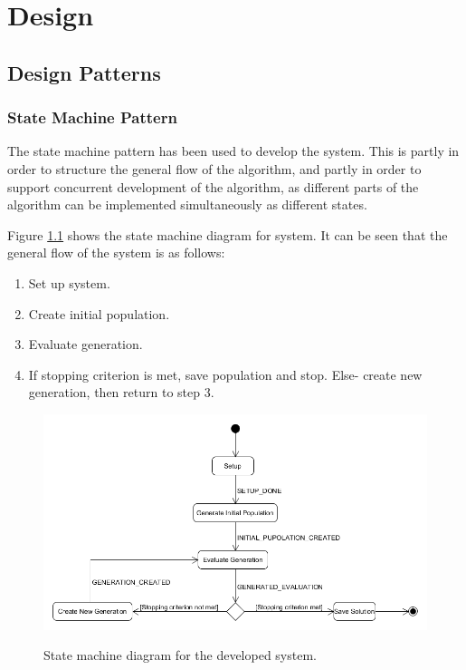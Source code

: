 
\chapter{Design}
\section{Design Patterns}
\subsection{State Machine Pattern}
The state machine pattern has been used to develop the system. This is partly in order to structure the general flow of the algorithm, and partly in order to support concurrent development of the algorithm, as different parts of the algorithm can be implemented simultaneously as different states.

Figure \ref{fig:STM_diagram} shows the state machine diagram for system. It can be seen that the general flow of the system is as follows:
\begin{enumerate}
	\item Set up system.
	\item Create initial population.
	\item Evaluate generation.
	\item If stopping criterion is met, save population and stop. Else-  create new generation, then return to step 3.
\end{enumerate}

\begin{figure}[h]
	\centering
	{\includegraphics[scale=0.5]{Images/STM_ROGSAnne.PNG}}\\[0.5cm]
	\caption{State machine diagram for the developed system.}
	\label{fig:STM_diagram}
\end{figure}

